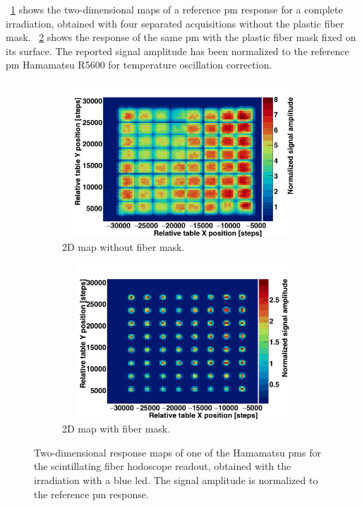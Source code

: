 \figurename~\ref{chap3::fig::hodoPMchar2DnoMask} shows the two-dimensional maps of a reference \gls{pm} response for a complete irradiation, obtained with four separated acquisitions without the plastic fiber mask. \figurename~\ref{chap3::fig::hodoPMchar2DwithMask} shows the response of the same \gls{pm} with the plastic fiber mask fixed on its surface. The reported signal amplitude has been normalized to the reference \gls{pm} Hamamatsu R5600 for temperature oscillation correction.

\begin{figure}
\begin{subfigure}[t]{.5\textwidth}
\centering
\includegraphics[width=1\textwidth, height = 5.8cm ]{03_GraphicFiles/chapter3_CLaRySproto/Hodoscope/PMchar/Maps_noMask/2DMap_PM2_notNorm.png}
\caption{2D map without fiber mask.}
\label{chap3::fig::hodoPMchar2DnoMask}
\end{subfigure}
\begin{subfigure}[t]{.5\textwidth}
\centering
\includegraphics[width=1\textwidth, height = 5.8cm ]{03_GraphicFiles/chapter3_CLaRySproto/Hodoscope/PMchar/Maps_withMask/2DMap_PM2_notNorm.png}
\caption{2D map with fiber mask.}
\label{chap3::fig::hodoPMchar2DwithMask}
\end{subfigure}
\caption{Two-dimensional response maps of one of the Hamamatsu \glspl{pm} for the scintillating fiber hodoscope readout, obtained with the irradiation with a blue 	\gls{led}. The signal amplitude is normalized to the reference \gls{pm} response.}
\label{chap3::fig::hodoPMchar2Dmaps}
\end{figure}


